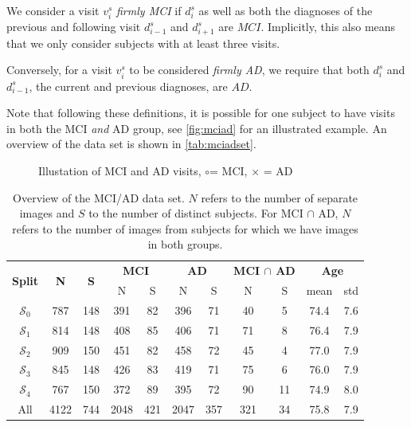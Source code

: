 We consider a visit $v^s_i$ \textit{firmly MCI} if $d^s_i$ as well as both the diagnoses of the previous and following visit $d^s_{i-1}$ and $d^s_{i+1}$ are $MCI$. Implicitly, this also means that we only consider subjects with at least three visits.

Conversely, for a visit $v^s_i$ to be considered \textit{firmly AD}, we require that both $d^s_i$ and $d^s_{i-1}$, the current and previous diagnoses, are $AD$.

Note that following these definitions, it is possible for one subject to have visits in both the MCI \textit{and} AD group, see \autoref{fig:mciad} for an illustrated example. An overview of the data set is shown in \autoref{tab:mciadset}.

\begin{figure}[h]
	\centering
	
	\caption{Illustation of MCI and AD visits, \Large$\circ$\normalsize\;= MCI, $\times$ = AD}
	\label{fig:mciad}
\end{figure}

\vspace{20pt}

\begin{table}[p]
	\begin{center}
		\begin{tabular}{c c c c c c c c c c c}
			\toprule
			\multirow{2}{*}{\bfseries Split} & 
			\multirow{2}{*}{\bfseries N} & 
			\multirow{2}{*}{\bfseries S} & 
			\multicolumn{2}{c}{\bfseries MCI} & 
			\multicolumn{2}{c}{\bfseries AD} & 
			\multicolumn{2}{c}{\bfseries MCI $\cap$ AD} &
			\multicolumn{2}{c}{\bfseries Age} \\
			\cmidrule(lr){4-5}
			\cmidrule(lr){6-7}
			\cmidrule(lr){8-9}
			\cmidrule(lr){10-11} 
			& & & N & S & N & S & N & S & mean & std \\ 
			\cmidrule(lr){1-11}
			$\mathcal{S}_0$ &  787 & 148 &  391 &  82 &  396 &  71 &  40 &  5 & 74.4 & 7.6 \\
			$\mathcal{S}_1$ &  814 & 148 &  408 &  85 &  406 &  71 &  71 &  8 & 76.4 & 7.9 \\
			$\mathcal{S}_2$ &  909 & 150 &  451 &  82 &  458 &  72 &  45 &  4 & 77.0 & 7.9 \\
			$\mathcal{S}_3$ &  845 & 148 &  426 &  83 &  419 &  71 &  75 &  6 & 76.0 & 7.9 \\
			$\mathcal{S}_4$ &  767 & 150 &  372 &  89 &  395 &  72 &  90 & 11 & 74.9 & 8.0 \\
			\cmidrule(lr){1-11}
			All             & 4122 & 744 & 2048 & 421 & 2047 & 357 & 321 & 34 & 75.8 & 7.9 \\
			\bottomrule
		\end{tabular}
		\caption{Overview of the MCI/AD data set. $N$ refers to the number of separate images and $S$ to the number of distinct subjects. For MCI $\cap$ AD, $N$ refers to the number of images from subjects for which we have images in both groups.}
		\label{tab:mciadset}
	\end{center}
\end{table}

